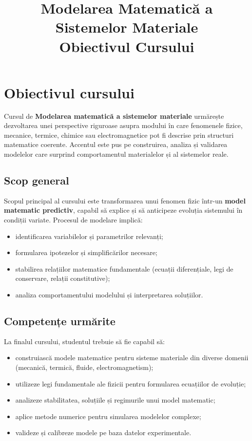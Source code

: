 \documentclass[12pt,a4paper]{article}
\title{Modelarea Matematică a Sistemelor Materiale \\ \large Obiectivul Cursului}
\author{}
\date{}
\begin{document}
\maketitle

\section{Obiectivul cursului}

Cursul de \textbf{Modelarea matematică a sistemelor materiale} urmărește dezvoltarea unei perspective riguroase asupra modului în care fenomenele fizice, mecanice, termice, chimice sau electromagnetice pot fi descrise prin structuri matematice coerente. Accentul este pus pe construirea, analiza și validarea modelelor care surprind comportamentul materialelor și al sistemelor reale.

\subsection{Scop general}

Scopul principal al cursului este transformarea unui fenomen fizic într-un \textbf{model matematic predictiv}, capabil să explice și să anticipeze evoluția sistemului în condiții variate. Procesul de modelare implică:
\begin{itemize}
    \item identificarea variabilelor și parametrilor relevanți;
    \item formularea ipotezelor și simplificărilor necesare;
    \item stabilirea relațiilor matematice fundamentale (ecuații diferențiale, legi de conservare, relații constitutive);
    \item analiza comportamentului modelului și interpretarea soluțiilor.
\end{itemize}

\subsection{Competențe urmărite}

La finalul cursului, studentul trebuie să fie capabil să:
\begin{itemize}
    \item construiască modele matematice pentru sisteme materiale din diverse domenii (mecanică, termică, fluide, electromagnetism);
    \item utilizeze legi fundamentale ale fizicii pentru formularea ecuațiilor de evoluție;
    \item analizeze stabilitatea, soluțiile și regimurile unui model matematic;
    \item aplice metode numerice pentru simularea modelelor complexe;
    \item valideze și calibreze modele pe baza datelor experimentale.
\end{itemize}
\end{document}
